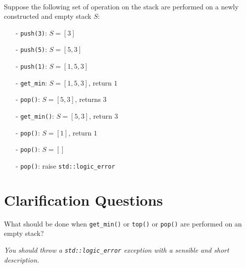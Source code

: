\begin{exercise}
	\begin{example}
		\hfill \\
		Suppose the following set of operation on the stack are performed on a newly constructed and empty stack $S$:
		\begin{itemize}
			\item[-] \lstinline[columns=fixed]{push(3)}: $S=[3]$
			\item[-] \lstinline[columns=fixed]{push(5)}: $S=[5,3]$
			\item[-] \lstinline[columns=fixed]{push(1)}: $S=[1,5,3]$
			\item[-] \lstinline[columns=fixed]{get_min}: $S=[1,5,3]$, return $1$
			\item[-] \lstinline[columns=fixed]{pop()}: $S=[5,3]$, returns $3$
			\item[-] \lstinline[columns=fixed]{get_min()}: $S=[5,3]$, return $3$
			\item[-] \lstinline[columns=fixed]{pop()}: $S=[1]$, return $1$
			\item[-] \lstinline[columns=fixed]{pop()}: $S=[]$
			\item[-] \lstinline[columns=fixed]{pop()}: raise \lstinline[columns=fixed]{std::logic_error}
		\end{itemize}
		
	\end{example}
\end{exercise}

\section{Clarification Questions}

\begin{QandA}
	\item \begin{questionitem} \begin{question} What should be done when \lstinline[columns=fixed]{get_min()} or \lstinline[columns=fixed]{top()} or \lstinline[columns=fixed]{pop()} are performed on an empty stack?  \end{question} 	 
    \begin{answered}
		\textit{You should throw a \lstinline[columns=fixed]{std::logic_error} exception with a sensible and short description.}
	\end{answered} \end{questionitem}
	
\end{QandA}

